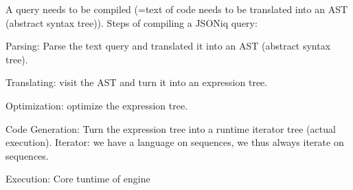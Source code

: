 \documentclass[11pt,oneside,a4paper]{article}
\begin{document}
{A query needs to be compiled (=text of code needs to be translated into an AST (abstract syntax tree)). Steps of compiling a JSONiq query:

\begin{compactenum}
\item Parsing: Parse the text query and translated it into an AST (abstract syntax tree).
\item Translating: visit the AST and turn it into an expression tree.
\item Optimization: optimize the expression tree.
\item Code Generation: Turn the expression tree into a runtime iterator tree (actual execution). Iterator: we have a language on sequences, we thus always iterate on sequences.
\item Execution: Core tuntime of engine
\end{compactenum}

}
\end{document}
